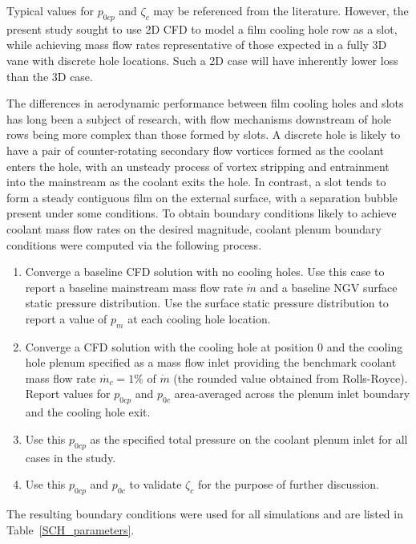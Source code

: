 \documentclass[a4paper, 11pt, oneside]{report}
\begin{document}
Typical values for $p_{0cp}$ and $\zeta_c$ may be referenced from the literature. However, the present study sought to use 2D CFD to model a film cooling hole row as a slot, while achieving mass flow rates representative of those expected in a fully 3D vane with discrete hole locations. Such a 2D case will have inherently lower loss than the 3D case. 

The differences in aerodynamic performance between film cooling holes and slots has long been a subject of research, with flow mechanisms downstream of hole rows being more complex than those formed by slots. A discrete hole is likely to have a pair of counter-rotating secondary flow vortices formed as the coolant enters the hole, with an unsteady process of vortex stripping and entrainment into the mainstream as the coolant exits the hole. In contrast, a slot tends to form a steady contiguous film on the external surface, with a separation bubble present under some conditions. To obtain boundary conditions likely to achieve coolant mass flow rates on the desired magnitude, coolant plenum boundary conditions were computed via the following process.
\begin{enumerate}
  \item Converge a baseline CFD solution with no cooling holes. Use this case to report a baseline mainstream mass flow rate $\dot{m}$ and a baseline NGV surface static pressure distribution. Use the surface static pressure distribution to report a value of $p_m$ at each cooling hole location.
  \item Converge a CFD solution with the cooling hole at position $0$ and the cooling hole plenum specified as a mass flow inlet providing the benchmark coolant mass flow rate $\dot{m_c} = 1\%$ of $\dot{m}$ (the rounded value obtained from Rolls-Royce). Report values for $p_{0cp}$ and $p_{0c}$ area-averaged across the plenum inlet boundary and the cooling hole exit.
  \item Use  this $p_{0cp}$ as the specified total pressure on the coolant plenum inlet for all cases in the study.
  \item Use this $p_{0cp}$ and $p_{0c}$ to validate $\zeta_c$ for the purpose of further discussion.
\end{enumerate}

The resulting boundary conditions were used for all simulations and are listed in Table~\ref{SCH_parameters}.
\end{document}
